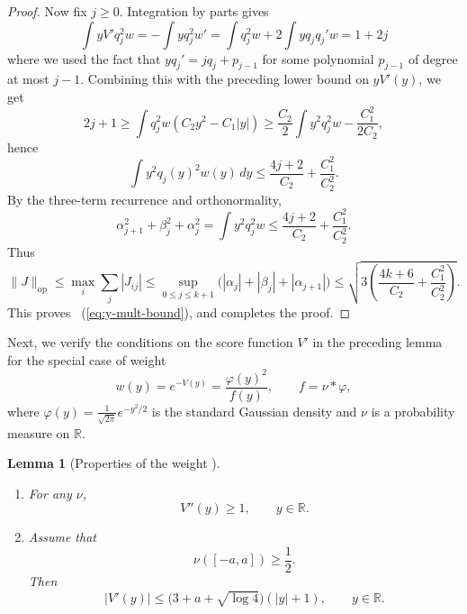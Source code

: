 \documentclass[letterpaper,11pt]{article}
\newcommand{\eqref}[1]{~(\ref{#1})}
\newcommand{\reals}{\mathbb{R}}
\newtheorem{lemma}[theorem]{Lemma}
\theoremstyle{definition}
\newcommand{\op}{\mathrm{op}}
\begin{document}
\begin{proof}
      Now fix $j\ge 0$. 
      Integration by parts gives
      \[
  \int yV' q_j^2 w
  = - \int yq_j^2 w'
  = \int q_j^2 w + 2 \int y q_j q_j' w
  = 1 + 2j
      \]
      where we used the fact that 
      $y q_j' = j q_j + p_{j-1}$ for some polynomial $p_{j-1}$ of degree at most $j-1$.
      Combining this with the preceding lower bound on $yV'(y)$, we get
      \[
        2j+1
        \ge
        \int  q_j^2 w(C_2y^2-C_1|y|)
        \geq 
        \frac{C_2}{2}\int y^2 q_j^2 w-\frac{C_1^2}{2C_2},
      \]
      hence
      \[
        \int y^2 q_j(y)^2 w(y)\,dy
        \le
        \frac{4j+2}{C_2}+\frac{C_1^2}{C_2^2}.
      \]
      By the three-term recurrence and orthonormality,
      \[
        \alpha_{j+1}^2+\beta_j^2+\alpha_j^2
        =
        \int y^2 q_j^2 w
        \le
        \frac{4j+2}{C_2}+\frac{C_1^2}{C_2^2}.
      \]
      Thus
      \[
        \|J\|_{\op}
        \le
       \max_i \sum_j |J_{ij}|
        \le
        {\sup_{0\le j\le k+1}\bigl(|\alpha_j|+|\beta_j|+|\alpha_{j+1}|\bigr)}
        \le
        {\sqrt{3\left(\frac{4k+6}{C_2}+\frac{C_1^2}{C_2^2}\right)}.}
      \]
      This proves \eqref{eq:y-mult-bound}, and completes the proof.
    \end{proof}

    Next, we verify the conditions on the score function $V'$ in the preceding lemma for the special case of weight
    \begin{equation}
      w(y)=e^{-V(y)}=\frac{\varphi(y)^2}{f(y)},
      \qquad
      f=\nu * \varphi,
      \label{eq:w-general}
    \end{equation}
    where $\varphi(y)=\frac{1}{\sqrt{2\pi}} e^{-y^2/2}$ is the standard Gaussian density and $\nu$ is a probability measure on $\reals$.


\begin{lemma}[Properties of the weight ]
\label{lem:Vpp-phi2-over-f}
\begin{enumerate}
    \item For any $\nu$,
\begin{equation}
V''(y)\ge 1,\qquad y\in\mathbb R.
\label{eq:V2}
\end{equation}

\item Assume that
\begin{equation}
\nu([-a,a]) \ge \frac12.
\label{eq:nubulk}
\end{equation}
Then
\begin{equation}
|V'(y)| \le \bigl(3+a+\sqrt{\log 4}\bigr)(|y|+1),
\qquad y\in\mathbb R.
\label{eq:V1}
\end{equation}
\end{enumerate}
\end{lemma}
\end{document}
